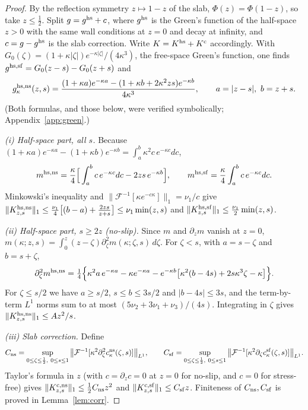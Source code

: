 \begin{proof}
By the reflection symmetry $z\mapsto1-z$ of the slab, $\Phi(z)=\Phi(1-z)$, so take $z\le\frac12$. Split
$g=g^{\rm hs}+c$, where $g^{\rm hs}$ is the Green's function of the half-space $z>0$ with the same wall
conditions at $z=0$ and decay at infinity, and $c=g-g^{\rm hs}$ is the slab correction. Write $K=K^{\rm
hs}+K^{\rm c}$ accordingly. With $G_0(\zeta)=(1+\kappa|\zeta|)e^{-\kappa|\zeta|}/(4\kappa^3)$, the free-space
Green's function, one finds $g^{\rm hs,sf}=G_0(z-s)-G_0(z+s)$ and
\[
g^{\rm hs,ns}_\kappa(z,s)=\frac{(1+\kappa a)e^{-\kappa a}-(1+\kappa b+2\kappa^2zs)e^{-\kappa b}}{4\kappa^3},
\qquad a=|z-s|,\ b=z+s .
\]
(Both formulas, and those below, were verified symbolically; Appendix~\ref{app:green}.)

\emph{(i) Half-space part, all $s$.} Because $(1+\kappa a)e^{-\kappa a}-(1+\kappa b)e^{-\kappa
b}=\int_a^b\kappa^2c\,e^{-\kappa c}dc$,
\[
m^{\rm hs,ns}=\frac\kappa4\Big[\int_a^bc\,e^{-\kappa c}dc-2zs\,e^{-\kappa b}\Big],\qquad
m^{\rm hs,sf}=\frac\kappa4\int_a^bc\,e^{-\kappa c}dc .
\]
Minkowski's inequality and $\|\mathcal F^{-1}[\kappa e^{-c\kappa}]\|_1=\nu_1/c$ give
$\|K^{\rm hs,ns}_{z,s}\|_1\le\frac{\nu_1}4\big[(b-a)+\frac{2zs}{z+s}\big]\le\nu_1\min(z,s)$ and
$\|K^{\rm hs,sf}_{z,s}\|_1\le\frac{\nu_1}2\min(z,s)$.

\emph{(ii) Half-space part, $s\ge2z$ (no-slip).} Since $m$ and $\partial_zm$ vanish at $z=0$,
$m(\kappa;z,s)=\int_0^z(z-\zeta)\partial_\zeta^2m(\kappa;\zeta,s)\,d\zeta$. For $\zeta<s$, with $a=s-\zeta$ and
$b=s+\zeta$,
\[
\partial_\zeta^2m^{\rm hs,ns}=\tfrac14\Big\{\kappa^2a\,e^{-\kappa a}-\kappa e^{-\kappa a}
-e^{-\kappa b}\big[\kappa^2(b-4s)+2s\kappa^3\zeta-\kappa\big]\Big\}.
\]
For $\zeta\le s/2$ we have $a\ge s/2$, $s\le b\le 3s/2$ and $|b-4s|\le3s$, and the term-by-term $L^1$ norms
sum to at most $(5\nu_2+3\nu_1+\nu_3)/(4s)$. Integrating in $\zeta$ gives
$\|K^{\rm hs,ns}_{z,s}\|_1\le Az^2/s$.

\emph{(iii) Slab correction.} Define
\begin{equation}\label{eq:Cns}
C_{\rm ns}=\sup_{0\le\zeta\le\frac12,\ 0\le s\le1}\big\|\mathcal F^{-1}[\kappa^2\partial_\zeta^2c^{\rm ns}_\kappa(\zeta,s)]\big\|_{L^1},\qquad
C_{\rm sf}=\sup_{0\le\zeta\le\frac12,\ 0\le s\le1}\big\|\mathcal F^{-1}[\kappa^2\partial_\zeta c^{\rm sf}_\kappa(\zeta,s)]\big\|_{L^1}.
\end{equation}
Taylor's formula in $z$ (with $c=\partial_zc=0$ at $z=0$ for no-slip, and $c=0$ for stress-free) gives
$\|K^{\rm c,ns}_{z,s}\|_1\le\tfrac12C_{\rm ns}z^2$ and $\|K^{\rm c,sf}_{z,s}\|_1\le C_{\rm sf}z$. Finiteness of
$C_{\rm ns},C_{\rm sf}$ is proved in Lemma~\ref{lem:corr}.


\end{proof}
